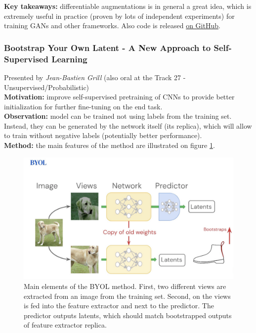 {\bf Key takeaways:} differentiable augmentations is in general a great idea, which is extremely useful in practice (proven by lots of independent experiments) for training GANs and other frameworks. Also code is released \href{https://github.com/mit-han-lab/data-efficient-gans}{on GitHub}.

\subsubsection{Bootstrap Your Own Latent - A New Approach to Self-Supervised Learning \cite{GrillSATRBDPGAP20}}

Presented by \textit{Jean-Bastien Grill} (also oral at the Track 27 - Unsupervised/Probabilistic)  \\

{\bf Motivation:} improve self-supervised pretraining of CNNs to provide better initialization for further fine-tuning on the end task. \\

{\bf Observation:} model can be trained not using labels from the training set. Instead, they can be generated by the network itself (its replica), which will allow to train without negative labels (potentially better performance). \\

{\bf Method:} the main features of the method are illustrated on figure \ref{fig:self_supervision_framework}.

\begin{figure}[h!]
    \centering
    \includegraphics[scale=0.4]{neurips-2020/images/Screenshot 2020-12-11 at 19.06.09.png}
    \caption{Main elements of the BYOL method. First, two different views are extracted from an image from the training set. Second, on the views is fed into the feature extractor and next to the predictor. The predictor outputs latents, which should match bootstrapped outputs of feature extractor replica.}
    \label{fig:self_supervision_framework}
\end{figure} \\

